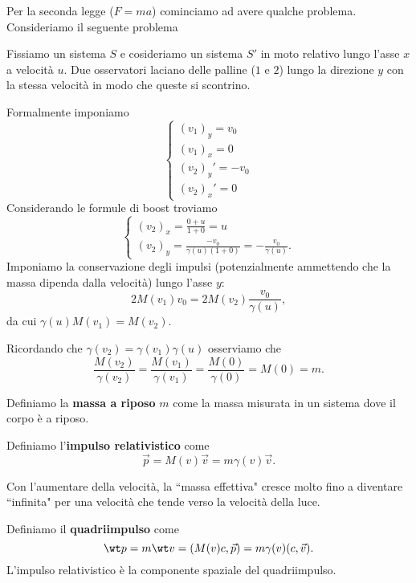 \noindent Per la seconda legge ($F=ma$) cominciamo ad avere qualche problema. Consideriamo il seguente problema
\begin{example}
Fissiamo un sistema $S$ e cosideriamo un sistema $S'$ in moto relativo lungo l'asse $x$ a velocit\`a $u$. Due osservatori laciano delle palline ($1$ e $2$) lungo la direzione $y$ con la stessa velocit\`a in modo che queste si scontrino.
\medskip

\noindent Formalmente imponiamo
\[\begin{cases}
(v_1)_y=v_0\\
(v_1)_x=0\\
(v_2)_y'=-v_0\\
(v_2)_x'=0
\end{cases}\]
Considerando le formule di boost troviamo
\[\begin{cases}
(v_2)_x=\frac{0+u}{1+0}=u\\
(v_2)_y=\frac{-v_0}{\gamma(u)(1+0)}=-\frac{v_0}{\gamma(u)}.
\end{cases}\]
Imponiamo la conservazione degli impulsi (potenzialmente ammettendo che la massa dipenda dalla velocit\`a) lungo l'asse $y$:
\[2M(v_1)v_0=2M(v_2)\frac{v_0}{\gamma(u)},\]
da cui $\gamma(u)M(v_1)=M(v_2)$.\medskip

\noindent Ricordando che $\gamma(v_2)=\gamma(v_1)\gamma(u)$ osserviamo che
\[\frac{M(v_2)}{\gamma(v_2)}=\frac{M(v_1)}{\gamma(v_1)}=\frac{M(0)}{\gamma(0)}=M(0)=m.\]
\end{example}

\begin{definition}
Definiamo la \textbf{massa a riposo} $m$ come la massa misurata in un sistema dove il corpo \`e a riposo.
\end{definition}

\begin{definition}
Definiamo l'\textbf{impulso relativistico} come
\[\vec p=M(v)\vec v=m\gamma(v)\vec v.\]
\end{definition}
\begin{remark}
Con l'aumentare della velocit\`a, la ``massa effettiva" cresce molto fino a diventare ``infinita" per una velocit\`a che tende verso la velocit\`a della luce.
\end{remark}

\begin{definition}[Quadriimpulso]
Definiamo il \textbf{quadriimpulso} come
\[\wt p=m\wt v=(M(v)c,\vec p)=m\gamma(v)(c,\vec v).\]
L'impulso relativistico \`e la componente spaziale del quadriimpulso.
\end{definition}


